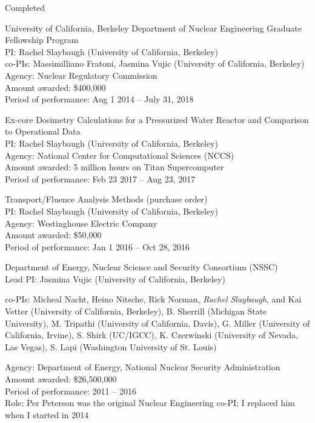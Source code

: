 \begin{rSubsection}{Completed}{}{}{}
\vspace*{0.3 em}
\item University of California, Berkeley Department of Nuclear Engineering Graduate Fellowship Program\\ 
PI: Rachel Slaybaugh (University of California, Berkeley)\\
\hspace*{1 em} co-PIs: Massimilliano Fratoni, Jasmina Vujic (University of California, Berkeley)\\
Agency: Nuclear Regulatory Commission \\
Amount awarded: \$400,000\\
Period of performance: Aug 1 2014 -- July 31, 2018

\vspace*{0.3 em}
\item Ex-core Dosimetry Calculations for a Pressurized Water Reactor and Comparison to Operational Data\\ 
PI: Rachel Slaybaugh (University of California, Berkeley)\\
Agency: National Center for Computational Sciences (NCCS)\\
Amount awarded: 5 million hours on Titan Supercomputer\\
Period of performance: Feb 23 2017 -- Aug 23, 2017

\vspace*{0.3 em}
\item Transport/Fluence Analysis Methods (purchase order)\\ 
PI: Rachel Slaybaugh (University of California, Berkeley)\\
Agency: Westinghouse Electric Company\\
Amount awarded: \$50,000\\
Period of performance: Jan 1 2016 -- Oct 28, 2016

\vspace*{0.3 em}
\item Department of Energy, Nuclear Science and Security Consortium (NSSC)\\
Lead PI: Jasmina Vujic (University of California, Berkeley)
\vspace*{-.6 em}
\begin{addmargin}[1em]{0 em}
co-PIs: Micheal Nacht, Heino Nitsche, Rick Norman, \textit{Rachel Slaybaugh}, and Kai Vetter (University of California, Berkeley), B. Sherrill  (Michigan State University), M. Tripathi (University of California, Davis), G. Miller (University of California, Irvine), S. Shirk (UC/IGCC), K. Czerwinski (University of Nevada, Las Vegas), S. Lapi (Washington University of St. Louis)
\end{addmargin}
\vspace*{-.6 em}
Agency:  Department of Energy, National Nuclear Security Administration\\
Amount awarded: \$26,500,000\\
Period of performance: 2011 -- 2016\\
Role: Per Peterson was the original Nuclear Engineering co-PI; I replaced him when I started in 2014
\end{rSubsection}


